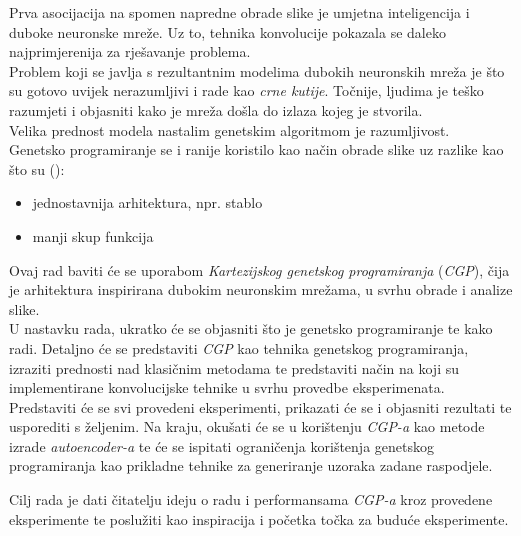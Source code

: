 Prva asocijacija na spomen napredne obrade slike je umjetna inteligencija i duboke neuronske mreže.
Uz to, tehnika konvolucije pokazala se daleko najprimjerenija za rješavanje problema. \\
Problem koji se javlja s rezultantnim modelima dubokih neuronskih mreža je što su gotovo uvijek nerazumljivi i rade kao \emph{crne kutije}.
Točnije, ljudima je teško razumjeti i objasniti kako je mreža došla do izlaza kojeg je stvorila. \\
Velika prednost modela nastalim genetskim algoritmom je razumljivost. \\
Genetsko programiranje se i ranije koristilo kao način obrade slike uz razlike kao što su (\cite{cgp_image_processing}):
\begin{itemize}
	\item jednostavnija arhitektura, npr. stablo
	\item manji skup funkcija
\end{itemize}

Ovaj rad baviti će se uporabom \emph{Kartezijskog genetskog programiranja} (\emph{CGP}), čija je arhitektura inspirirana dubokim neuronskim mrežama, u svrhu obrade i analize slike. \\
U nastavku rada, ukratko će se objasniti što je genetsko programiranje te kako radi.
Detaljno će se predstaviti \emph{CGP} kao tehnika genetskog programiranja, izraziti prednosti nad klasičnim metodama te predstaviti način na koji su implementirane konvolucijske tehnike u svrhu provedbe eksperimenata.
Predstaviti će se svi provedeni eksperimenti, prikazati će se i objasniti rezultati te usporediti s željenim.
Na kraju, okušati će se u korištenju \emph{CGP-a} kao metode izrade \emph{autoencoder-a} te će se ispitati ograničenja korištenja genetskog programiranja kao prikladne tehnike za generiranje uzoraka zadane raspodjele.

Cilj rada je dati čitatelju ideju o radu i performansama \emph{CGP-a} kroz provedene eksperimente te poslužiti kao inspiracija i početka točka za buduće eksperimente.
